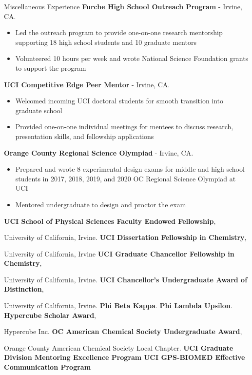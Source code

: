 \begin{rubric}{Miscellaneous Experience}
   \textbf{Furche High School Outreach Program} - Irvine, CA.
  \vspace{-0.5em}
   \begin{itemize}
   \itemsep-0.5em
   \item Led the outreach program to provide one-on-one research mentorship supporting
     18 high school students and 10 graduate mentors
   \item Volunteered 10 hours per week and wrote National Science Foundation grants
     to support the program
   \vspace{-1em}
   \end{itemize}
%
    \textbf{UCI Competitive Edge Peer Mentor} - Irvine, CA.
   \vspace{-0.5em}
   \begin{itemize}
   \itemsep-0.5em
   \item Welcomed incoming UCI doctoral students for smooth transition into graduate school
   \item Provided one-on-one individual meetings for mentees to discuss research, presentation
     skills, and fellowship applications
   \vspace{-1em}
   \end{itemize}
%   
 \textbf{Orange County Regional Science Olympiad} - Irvine, CA.
\vspace{-0.5em}
   \begin{itemize}
   \itemsep-0.5em
   \item Prepared and wrote 8 experimental design exams for middle and high school students in
     2017, 2018, 2019, and 2020 OC Regional Science Olympiad at UCI
   \item Mentored undergraduate to design and proctor the exam
   \vspace{-1em}
   \end{itemize}
%
\entry*[Jun 2021] \textbf{UCI School of Physical Sciences Faculty Endowed Fellowship},

University of California, Irvine.
%
\entry*[Jun 2021] \textbf{UCI Dissertation Fellowship in Chemistry},

University of California, Irvine
%
\entry*[Sept 2016] \textbf{UCI Graduate Chancellor Fellowship in Chemistry},

University of California, Irvine.
%
\entry*[Jun 2015] \textbf{UCI Chancellor's Undergraduate Award of Distinction},

University of California, Irvine.
%
\entry*[May 2015] \textbf{Phi Beta Kappa}.
%
\entry*[May 2015] \textbf{Phi Lambda Upsilon}.
%
\entry*[Jun 2014] \textbf{Hypercube Scholar Award},

Hypercube Inc.
%
\entry*[Apr 2014] \textbf{OC American Chemical Society Undergraduate Award},

Orange County American Chemical Society Local Chapter.
%
\entry*[Mar 2020] \textbf{UCI Graduate Division Mentoring Excellence Program}
%
\entry*[Jun 2017] \textbf{UCI GPS-BIOMED Effective Communication Program} 
\end{rubric}
